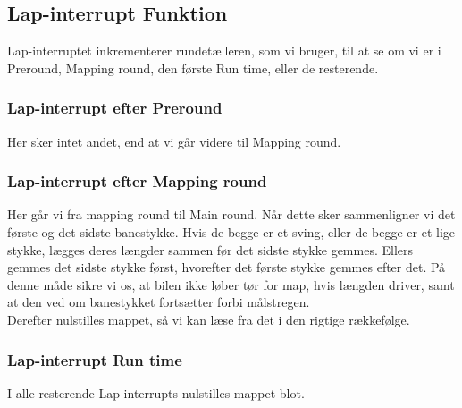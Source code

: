 \subsection{Lap-interrupt Funktion}

Lap-interruptet inkrementerer rundetælleren, som vi bruger, til at se om vi er i Preround, Mapping round, den første Run time, eller de resterende.

\subsubsection{Lap-interrupt efter Preround}

Her sker intet andet, end at vi går videre til Mapping round.

\subsubsection{Lap-interrupt efter Mapping round}

Her går vi fra mapping round til Main round. Når dette sker sammenligner vi det første og det sidste banestykke. Hvis de begge er et sving, eller de begge er et lige stykke, lægges deres længder sammen før det sidste stykke gemmes. Ellers gemmes det sidste stykke først, hvorefter det første stykke gemmes efter det. På denne måde sikre vi os, at bilen ikke løber tør for map, hvis længden driver, samt at den ved om banestykket fortsætter forbi målstregen.
\\
Derefter nulstilles mappet, så vi kan læse fra det i den rigtige rækkefølge.

\subsubsection{Lap-interrupt Run time}

I alle resterende Lap-interrupts nulstilles mappet blot.

